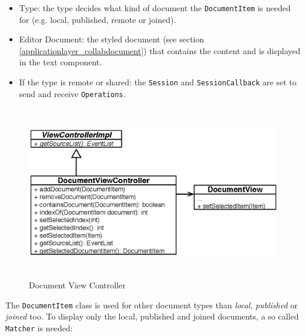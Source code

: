 \begin{itemize}
\item Type: the type decides what kind of document the \texttt{Document\-Item} is needed for (e.g. local, published, remote or joined).
\item Editor Document: the styled document (see section \ref{applicationlayer_collabdocument}) that contains the content and is displayed in the text component.
\item If the type is remote or shared: the \texttt{Session} and \texttt{Session\-Callback} are set to send and receive \texttt{Operations}.
\end{itemize}

\begin{figure}[H]
\begin{center}
  \includegraphics[height=2.99in, width=5.62in]{../images/finalreport/application_documentview.eps}
\caption{Document View Controller}
\label{application_documentview}
\end{center}
\end{figure}

The \texttt{DocumentItem} class is used for other document types than \emph{local}, \emph{published} or \emph{joined} too. To display only the local, published and joined documents, a so called \texttt{Matcher} is needed:


